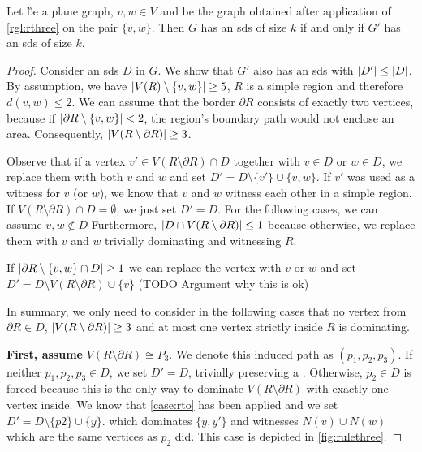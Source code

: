 \begin{lemma}\label{lemma:correctnessthree}
    Let \G be a plane graph, $v, w \in V$ and \GB be the graph obtained after application of \cref{rgl:rthree} on the pair $\{v, w\}$. Then $G$ has an sds of size $k$ if and only if $G'$ has an sds of size $k$.
\end{lemma}
\begin{proof}
        Consider an sds $D$ in $G$. We show that $G'$ also has an sds with $\abs{D'} \leq \abs{D}$. 
        By assumption, we have $\abs{V(R) \setminus \{v, w\}} \geq 5$, $R$ is a simple region and therefore $d(v,w) \leq 2$.
        We can assume that the border $\partial R$ consists of exactly two vertices, because if $\abs{\partial R \setminus \{v,w\}}  < 2$, the region's boundary path would not enclose an area.
        Consequently, $\abs{V(R \setminus \partial R)} \geq 3$.

        Observe that if a vertex $v' \in V(R \setminus \partial R) \cap D$ together with $v \in D$ or $w\in D$, we replace them with both $v$ and $w$ and set $D' = D \setminus \{v'\} \cup \{v,w\}$.  
        If $v'$ was used as a witness for $v$ (or $w$), we know that $v$ and $w$ witness each other in a simple region. 
        If $V(R \setminus \partial R) \cap D = \emptyset$, we just set $D' = D$. 
        For the following cases, we can assume $v,w \notin D$
        Furthermore, $\abs{D \cap V(R \setminus \partial R)} \leq 1$ 
        because otherwise, we replace them with $v$ and $w$ trivially dominating and witnessing $R$.

        If $\abs{\partial R \setminus \{v,w\} \cap D} \geq 1$ we can replace the vertex with $v$ or $w$ and set $D' = D \setminus V(R \setminus \partial R) \cup \{v\}$ (TODO Argument why this is ok)

        In summary, we only need to consider in the following cases that no vertex from $\partial R \in D$, $\abs{V(R \setminus \partial R)} \geq 3$ and at most one vertex strictly inside $R$ is dominating.

         \textbf{First, assume} $V(R \setminus \partial R) \cong P_3$. We denote this induced path as $(p_1,p_2,p_3)$.         
         If neither $p_1,p_2,p_3 \in D$, we set $D' = D$, trivially preserving a \sdom. Otherwise, $p_2 \in D$ is forced because this is the only way to dominate $V(R \setminus \partial R)$ with exactly one vertex inside. We know that \cref{case:rto} has been applied and we set $D' = D \setminus \{p2\} \cup \{y\}$. which dominates $\{y,y'\}$ and witnesses $N(v) \cup N(w)$ which are the same vertices as $p_2$ did. This case is depicted in \cref{fig:rulethree}.


\end{proof}

